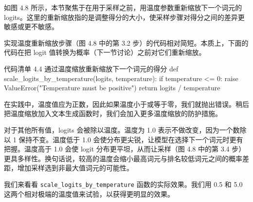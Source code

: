 如图 4.8 所示，本节聚焦于在用于采样之前，用温度参数重新缩放下一个词元的 logits。这里的重新缩放指的是调整得分的大小，使采样步骤对得分之间的差异更敏感或更不敏感。


实现温度重新缩放步骤（图 4.8 中的第 3.2 步）的代码相对简短。本质上，下面的代码在把 logit 值转换为概率（下一节讨论）之前对它们重新缩放。

\begin{codeboxt}{代码清单 4.4 通过温度缩放重新缩放下一个词元的得分}
def scale_logits_by_temperature(logits, temperature):
    if temperature <= 0:
        raise ValueError("Temperature must be positive")
    return logits / temperature
\end{codeboxt}

在实践中，温度值应为正数，因此如果温度小于或等于零，我们就抛出错误。稍后把温度缩放加入文本生成函数时，我们会加入更多温度缩放的防护措施。

对于其他所有值，logits 会被除以温度。温度为 1.0 表示不做改变，因为一个数除以 1 保持不变。温度低于 1.0 会使分布更尖锐，让模型在选择下一个词元时更有把握。温度高于 1.0 会使 logit 分布更平坦，从而让采样（图 4.8 中的第 3.4 步）更具多样性。换句话说，较高的温度会缩小最高词元与排名较低词元之间的概率差距，增加采样选到非最大值词元的可能性。

我们来看看 \texttt{scale\_logits\_by\_temperature} 函数的实际效果。我们用 0.5 和 5.0 这两个相对极端的温度值来试验，以获得更明显的效果。

